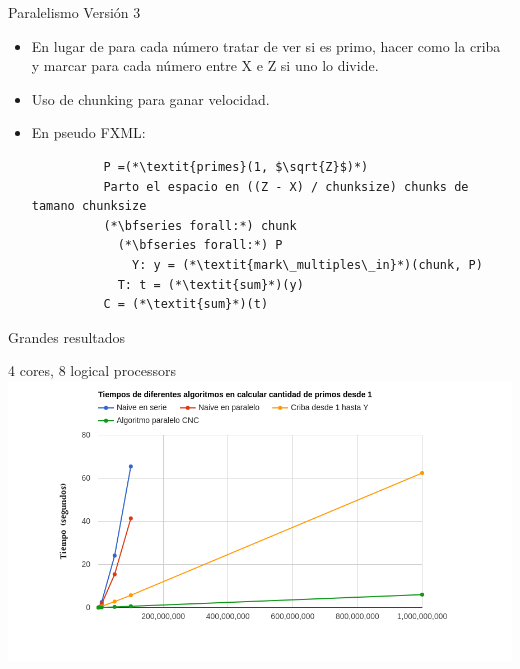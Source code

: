 \documentclass[compress]{beamer}
\begin{document}
\begin{frame}[fragile]{Paralelismo Versión 3}
  \begin{itemize}
    \setlength\itemsep{1em}
    \item<1-> En lugar de para cada número tratar de ver si es primo, hacer como la criba y marcar para cada número entre X e Z si uno lo divide.
    \item<2-> Uso de chunking para ganar velocidad.
    \item<3-> En pseudo FXML:
      \begin{lstlisting}
          P =(*\textit{primes}(1, $\sqrt{Z}$)*)
          Parto el espacio en ((Z - X) / chunksize) chunks de tamano chunksize
          (*\bfseries forall:*) chunk
            (*\bfseries forall:*) P
              Y: y = (*\textit{mark\_multiples\_in}*)(chunk, P)
            T: t = (*\textit{sum}*)(y)
          C = (*\textit{sum}*)(t)
      \end{lstlisting}
  \end{itemize}
\end{frame}

\begin{frame}{Grandes resultados}
  \begin{center}
  {4 cores, 8 logical processors}
  \\
  \includegraphics[width=1.15\textwidth]{imagenes/todoJulian.png}%
  \end{center}
\end{frame}
\end{document}

